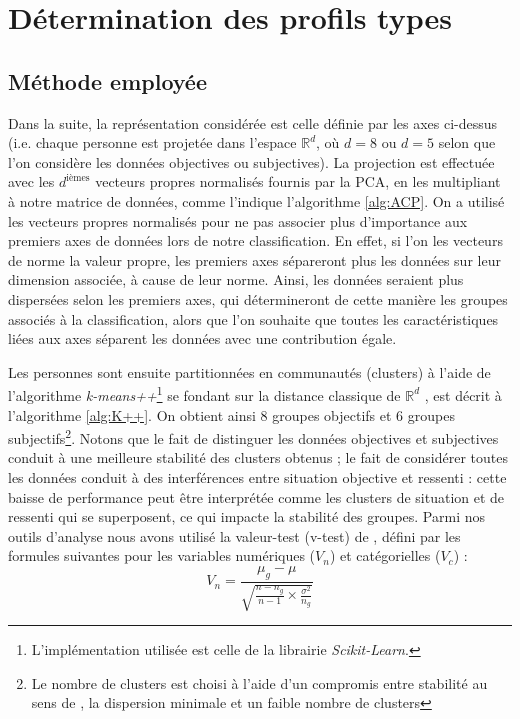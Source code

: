 \documentclass[11pt,fleqn,openany,frenchb]{book} %
\begin{document}
\clearpage

\section{Détermination des profils types}
\subsection{Méthode employée}

Dans la suite, la représentation considérée est celle définie par les axes ci-dessus (i.e. chaque personne est projetée dans l'espace $\mathbb{R}^d$, où $d=8$ ou $d=5$ selon que l'on considère les données objectives ou subjectives). La projection est effectuée avec les $d^{\textrm{ièmes}}$ vecteurs propres normalisés fournis par la PCA, en les multipliant à notre matrice de données, comme l'indique l'algorithme \ref{alg:ACP}. On a utilisé les vecteurs propres normalisés pour ne pas associer plus d'importance aux premiers axes de données lors de notre classification. En effet, si l'on les vecteurs de norme la valeur propre, les premiers axes sépareront plus les données sur leur dimension associée, à cause de leur norme. Ainsi, les données seraient plus dispersées selon les premiers axes, qui détermineront de cette manière les groupes associés à la classification, alors que l'on souhaite que toutes les caractéristiques liées aux axes séparent les données avec une contribution égale. 

Les personnes sont ensuite partitionnées en communautés (clusters) à l'aide de l'algorithme \textit{k-means++}\footnote{L'implémentation utilisée est celle de la librairie \textit{Scikit-Learn}.} se fondant sur la distance classique de $\mathbb{R}^d$ \cite{arthur2007k}, est décrit à l'algorithme \ref{alg:K++}.  On obtient ainsi 8 groupes objectifs et 6 groupes subjectifs\footnote{Le nombre de clusters est choisi à l'aide d'un compromis entre stabilité au sens de \cite{meilua2006uniqueness}, la dispersion minimale et un faible nombre de clusters}. Notons que le fait de distinguer les données objectives et subjectives conduit à une meilleure stabilité des clusters obtenus ; le fait de considérer toutes les données conduit à des interférences entre situation objective et ressenti : cette baisse de performance peut être interprétée comme les clusters de situation et de ressenti qui se superposent, ce qui impacte la stabilité des groupes. Parmi nos outils d'analyse nous avons utilisé la valeur-test (v-test) de \cite{lebart2006statistique}, défini par les formules suivantes pour les variables numériques ($V_n$) et catégorielles ($V_c$) : 
 $$ V_n= \frac{\mu_g-\mu}{\sqrt{\frac{n-n_g}{n-1}\times\frac{\sigma^2}{n_g}}} $$
\end{document}

